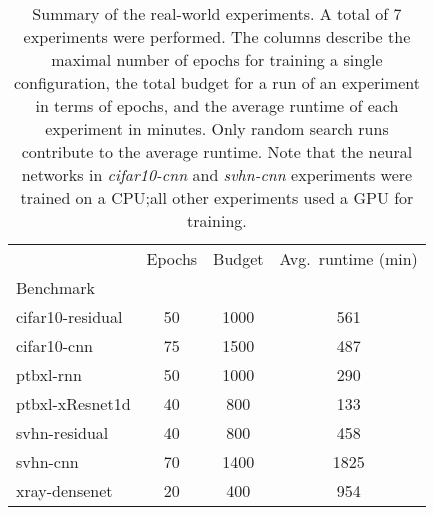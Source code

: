 \begin{table}
\caption{Summary of the real-world experiments. A total of 7 experiments were performed. The columns describe the maximal number of epochs for training a single configuration, the total budget for a run of an experiment in terms of epochs, and the average runtime of each experiment in minutes. Only random search runs contribute to the average runtime. Note that the neural networks in \textit{cifar10-cnn} and \textit{svhn-cnn} experiments were trained on a CPU;\@ all other experiments used a GPU for training.}
\label{tab:real_bench_summary}
\begin{tabular}{lccc}
\toprule
 & Epochs & Budget & Avg.\ runtime (min) \\
Benchmark &  &  &  \\
\midrule
cifar10-residual & 50 & 1000 & 561 \\
cifar10-cnn & 75 & 1500 & 487 \\
ptbxl-rnn & 50 & 1000 & 290 \\
ptbxl-xResnet1d & 40 & 800 & 133 \\
svhn-residual & 40 & 800 & 458 \\
svhn-cnn & 70 & 1400 & 1825 \\
xray-densenet & 20 & 400 & 954 \\
\bottomrule
\end{tabular}
\end{table}
